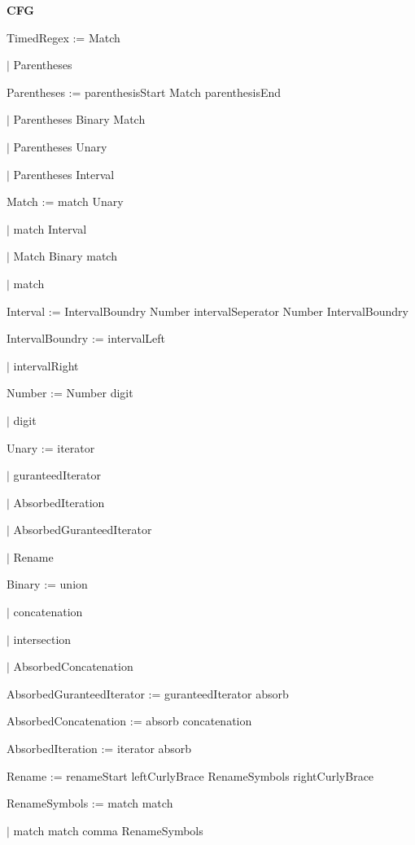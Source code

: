 
\textbf{CFG}

TimedRegex := Match

\qquad	$\mid$ Parentheses

Parentheses := parenthesisStart Match parenthesisEnd

\qquad	$\mid$ Parentheses Binary Match

\qquad	$\mid$ Parentheses Unary

\qquad $\mid$ Parentheses Interval

Match := match Unary

\qquad	$\mid$ match Interval

\qquad    $\mid$ Match Binary match

\qquad	$\mid$ match

Interval := IntervalBoundry Number intervalSeperator Number IntervalBoundry

IntervalBoundry := intervalLeft

\qquad	$\mid$ intervalRight

Number := Number digit

\qquad	$\mid$ digit

Unary := iterator

\qquad	$\mid$ guranteedIterator

\qquad	$\mid$ AbsorbedIteration

\qquad	$\mid$ AbsorbedGuranteedIterator

\qquad	$\mid$ Rename

Binary := union

\qquad	$\mid$ concatenation

\qquad	$\mid$ intersection

\qquad	$\mid$ AbsorbedConcatenation

AbsorbedGuranteedIterator := guranteedIterator absorb 

AbsorbedConcatenation := absorb concatenation

AbsorbedIteration := iterator absorb 

Rename := renameStart leftCurlyBrace RenameSymbols rightCurlyBrace

RenameSymbols := match match

\qquad	$\mid$ match match comma RenameSymbols